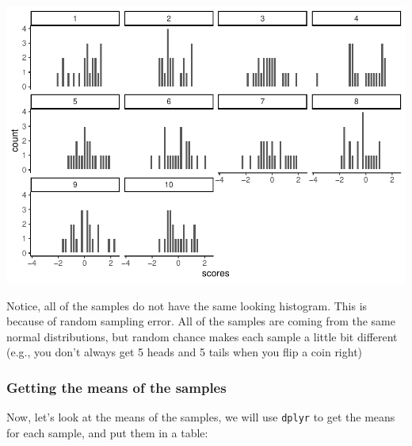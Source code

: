 \documentclass[]{book}
\newenvironment{Shaded}{\begin{snugshade}}{\end{snugshade}}
\newcommand{\KeywordTok}[1]{\textcolor[rgb]{0.13,0.29,0.53}{\textbf{#1}}}
\newcommand{\DataTypeTok}[1]{\textcolor[rgb]{0.13,0.29,0.53}{#1}}
\newcommand{\StringTok}[1]{\textcolor[rgb]{0.31,0.60,0.02}{#1}}
\newcommand{\OperatorTok}[1]{\textcolor[rgb]{0.81,0.36,0.00}{\textbf{#1}}}
\newcommand{\NormalTok}[1]{#1}
\begin{document}
\includegraphics{Statistics_Lab_files/figure-latex/unnamed-chunk-116-1.pdf}

Notice, all of the samples do not have the same looking histogram. This
is because of random sampling error. All of the samples are coming from
the same normal distributions, but random chance makes each sample a
little bit different (e.g., you don't always get 5 heads and 5 tails
when you flip a coin right)

\subsubsection{Getting the means of the
samples}\label{getting-the-means-of-the-samples}

Now, let's look at the means of the samples, we will use \texttt{dplyr}
to get the means for each sample, and put them in a table:

\begin{Shaded}
\end{Shaded}
\end{document}
